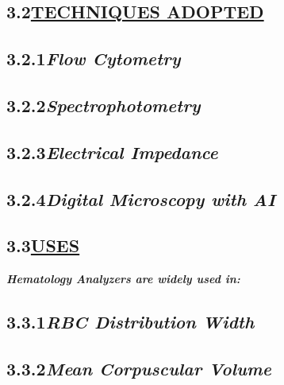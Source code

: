 \documentclass[12pt]{article}
\begin{document}
\subsection*{\hspace{1cm}\textbf{3.2\hspace{1cm}\underline{\LARGE{TECHNIQUES ADOPTED}}}}
\subsection*{\hspace{2cm}\textbf{3.2.1\hspace{1cm}\large{\emph{Flow Cytometry}}}}
\subsection*{\hspace{2cm}\textbf{3.2.2\hspace{1cm}\large{\emph{Spectrophotometry}}}}
\subsection*{\hspace{2cm}\textbf{3.2.3\hspace{1cm}\large{\emph{Electrical Impedance}}}}
\subsection*{\hspace{2cm}\textbf{3.2.4\hspace{1cm}\large{\emph{Digital Microscopy with AI}}}}
\newpage
\vspace{2cm}
\subsection*{\hspace{1cm}\textbf{3.3\hspace{1cm}\underline{\LARGE{USES}}}}
\hspace{1cm}\large{\emph{\textbf{Hematology Analyzers are widely used in:}}}
\subsection*{\hspace{2cm}\textbf{3.3.1\hspace{1cm}\emph{\large{RBC Distribution Width}}}}
\subsection*{\hspace{2cm}\textbf{3.3.2\hspace{1cm}\emph{\large{Mean Corpuscular Volume}}}}
\end{document}
